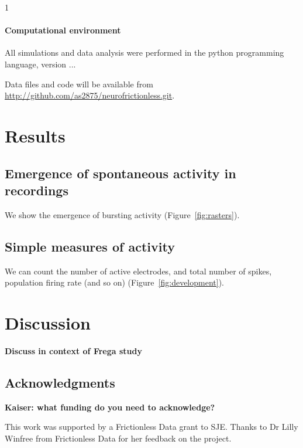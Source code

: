 1\documentclass[11pt]{article}
\begin{document}
{\paragraph{Computational environment}

All simulations and data analysis were performed in the python programming
language, version ...

Data files and code will be available from
\url{http://github.com/as2875/neurofrictionless.git}.



\clearpage
\section*{Results}


\subsection*{Emergence of spontaneous activity in recordings}


We show the emergence of bursting activity (Figure~\ref{fig:rasters}).

\subsection{Simple measures of activity}

We can count the number of active electrodes, and total number of
spikes, population firing rate (and so on)
(Figure~\ref{fig:development}).




\clearpage
\section*{Discussion}


\textbf{Discuss in context of Frega study}  \cite{Frega2019}
\vspace*{1cm}

\subsection*{Acknowledgments}

\textbf{Kaiser: what funding do you need to acknowledge?}


This work was supported by a Frictionless Data grant to SJE\@.  Thanks
to Dr Lilly Winfree from Frictionless Data for her feedback on the
project.

\clearpage





}
\end{document}
